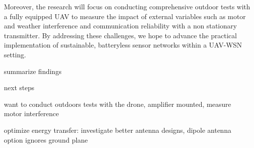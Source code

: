 \documentclass[conference]{IEEEtran}
\begin{document}
Moreover, the research will focus on conducting comprehensive outdoor tests with a fully equipped UAV to measure the impact of external variables such as motor and weather interference and communication reliability with a non stationary transmitter. By addressing these challenges, we hope to advance the practical implementation of sustainable, batteryless sensor networks within a UAV-WSN setting.

summarize findings

next steps

want to conduct outdoors tests with the drone, amplifier mounted, measure motor interference

optimize energy transfer: investigate better antenna designs, dipole antenna option ignores ground plane

% 
% 
\end{document}

